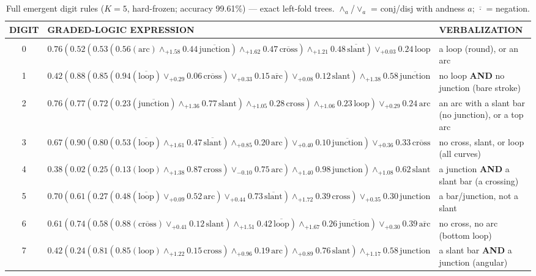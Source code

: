 \begin{table}[t]
\caption{Full emergent digit rules ($K{=}5$, hard-frozen; accuracy 99.61\%) --- exact left-fold trees. $\wedge_a$/$\vee_a$ = conj/disj with andness $a$; $\overline{\cdot}$ = negation.}
\label{tab:digit-rules-full}
\begin{center}\scriptsize
\begin{tabular}{c l l}
{\bf DIGIT} & {\bf GRADED-LOGIC EXPRESSION} & {\bf VERBALIZATION} \\ \hline \\
0 & $0.76(0.52(0.53(0.56(\text{arc})\wedge_{+1.58}0.44\,\overline{\text{junction}})\wedge_{+1.62}0.47\,\overline{\text{cross}})\wedge_{+1.21}0.48\,\overline{\text{slant}})\vee_{+0.03}0.24\,\text{loop}$ & a loop (round), or an arc \\[3pt]
1 & $0.42(0.88(0.85(0.94(\overline{\text{loop}})\vee_{+0.29}0.06\,\overline{\text{cross}})\vee_{+0.33}0.15\,\overline{\text{arc}})\vee_{+0.08}0.12\,\text{slant})\wedge_{+1.38}0.58\,\overline{\text{junction}}$ & no loop \textbf{AND} no junction (bare stroke) \\[3pt]
2 & $0.76(0.77(0.72(0.23(\overline{\text{junction}})\wedge_{+1.36}0.77\,\text{slant})\wedge_{+1.05}0.28\,\text{cross})\wedge_{+1.06}0.23\,\text{loop})\vee_{+0.29}0.24\,\text{arc}$ & an arc with a slant bar (no junction), or a top arc \\[3pt]
3 & $0.67(0.90(0.80(0.53(\overline{\text{loop}})\wedge_{+1.61}0.47\,\overline{\text{slant}})\wedge_{+0.85}0.20\,\text{arc})\vee_{+0.40}0.10\,\overline{\text{junction}})\vee_{+0.36}0.33\,\overline{\text{cross}}$ & no cross, slant, or loop (all curves) \\[3pt]
4 & $0.38(0.02(0.25(0.13(\text{loop})\wedge_{+1.38}0.87\,\text{cross})\vee_{-0.10}0.75\,\text{arc})\wedge_{+1.40}0.98\,\text{junction})\wedge_{+1.08}0.62\,\text{slant}$ & a junction \textbf{AND} a slant bar (a crossing) \\[3pt]
5 & $0.70(0.61(0.27(0.48(\overline{\text{loop}})\vee_{+0.09}0.52\,\text{arc})\vee_{+0.44}0.73\,\overline{\text{slant}})\wedge_{+1.72}0.39\,\text{cross})\vee_{+0.35}0.30\,\text{junction}$ & a bar/junction, not a slant \\[3pt]
6 & $0.61(0.74(0.58(0.88(\overline{\text{cross}})\vee_{+0.41}0.12\,\text{slant})\wedge_{+1.51}0.42\,\overline{\text{loop}})\wedge_{+1.67}0.26\,\overline{\text{junction}})\vee_{+0.30}0.39\,\overline{\text{arc}}$ & no cross, no arc (bottom loop) \\[3pt]
7 & $0.42(0.24(0.81(0.85(\text{loop})\wedge_{+1.22}0.15\,\text{cross})\wedge_{+0.96}0.19\,\text{arc})\wedge_{+0.89}0.76\,\text{slant})\wedge_{+1.17}0.58\,\text{junction}$ & a slant bar \textbf{AND} a junction (angular) \\[3pt]

\end{tabular}
\end{center}
\end{table}
